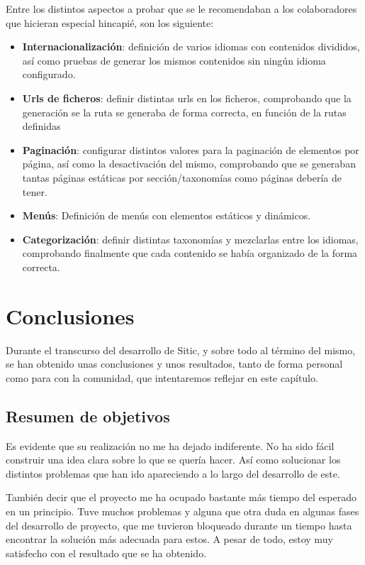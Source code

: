 \documentclass[a4paper,12pt]{article}
\begin{document}
Entre los distintos aspectos a probar que se le recomendaban a los
colaboradores que hicieran especial hincapié, son los siguiente:

\begin{itemize}
\item \textbf{Internacionalización}: definición de varios idiomas con contenidos divididos, así como pruebas de generar
los mismos contenidos sin ningún idioma configurado.
\item \textbf{Urls de ficheros}: definir distintas urls en los ficheros, comprobando que la generación se la ruta
se generaba de forma correcta, en función de la rutas definidas
\item \textbf{Paginación}: configurar distintos valores para la paginación de elementos por página, así como la desactivación
del mismo, comprobando que se generaban tantas páginas estáticas por sección/taxonomías como páginas debería de tener.
\item \textbf{Menús}: Definición de menús con elementos estáticos y dinámicos.
\item \textbf{Categorización}: definir distintas taxonomías y mezclarlas entre los idiomas, comprobando finalmente que cada
contenido se había organizado de la forma correcta.
\end{itemize}



\section{Conclusiones}

Durante el transcurso del desarrollo de Sitic, y sobre todo al término del mismo,
se han obtenido unas conclusiones y unos resultados, tanto de forma personal
como para con la comunidad, que intentaremos reflejar en este capítulo.

\subsection{Resumen de objetivos}

Es evidente que su realización no me ha dejado indiferente. No ha sido fácil construir una idea
clara sobre lo que se quería hacer. Así como solucionar los distintos problemas que han ido apareciendo
a lo largo del desarrollo de este.

También decir que el proyecto me ha ocupado bastante más tiempo del esperado en un principio. Tuve
muchos problemas y alguna que otra duda en algunas fases del desarrollo de proyecto, que me tuvieron
bloqueado durante un tiempo hasta encontrar la solución más adecuada para estos. A pesar de todo,
estoy muy satisfecho con el resultado que se ha obtenido.
\end{document}
